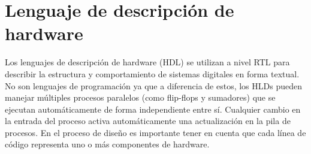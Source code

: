 \section{Lenguaje de descripción de hardware}

Los lenguajes de descripción de hardware (HDL) se utilizan a nivel RTL para describir la estructura y comportamiento de sistemas digitales en forma textual. No son lenguajes de programación ya que a diferencia de estos, los HLDs pueden manejar múltiples procesos paralelos (como flip-flops y sumadores) que se ejecutan automáticamente de forma independiente entre sí. Cualquier cambio en la entrada del proceso activa automáticamente una actualización en la pila de procesos. En el proceso de diseño es importante tener en cuenta que cada línea de código representa uno o más componentes de hardware.
 
